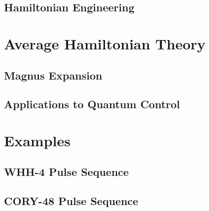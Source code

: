 \lipsum[1]

\subsection{Hamiltonian Engineering}

\lipsum[1-4]

%

\section{Average Hamiltonian Theory}\label{sec:AHT}

\lipsum[1-2]

\subsection{Magnus Expansion}

\lipsum[1-2]

\subsection{Applications to Quantum Control}

\lipsum[1-5]


\section{Examples}

\lipsum[1]

\subsection{WHH-4 Pulse Sequence}

\lipsum[1-3]

\subsection{CORY-48 Pulse Sequence}

